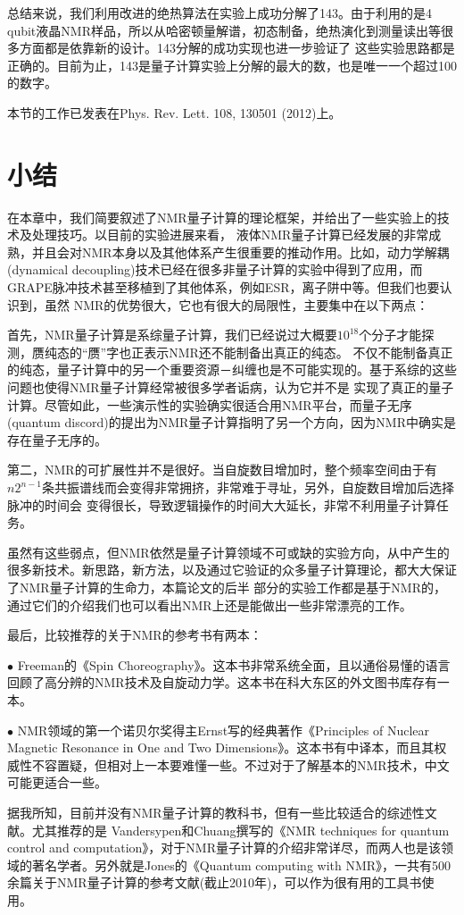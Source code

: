 总结来说，我们利用改进的绝热算法在实验上成功分解了143。由于利用的是4 qubit液晶NMR样品，所以从哈密顿量解谱，初态制备，绝热演化到测量读出等很多方面都是依靠新的设计。143分解的成功实现也进一步验证了
这些实验思路都是正确的。目前为止，143是量子计算实验上分解的最大的数，也是唯一一个超过100的数字。

本节的工作已发表在Phys. Rev. Lett. 108, 130501 (2012)\cite{shor143}上。



\section{小结}

在本章中，我们简要叙述了NMR量子计算的理论框架，并给出了一些实验上的技术及处理技巧。以目前的实验进展来看，
液体NMR量子计算已经发展的非常成熟，并且会对NMR本身以及其他体系产生很重要的推动作用。比如，动力学解耦(dynamical decoupling)技术已经在很多非量子计算的实验中得到了应用，而GRAPE脉冲技术甚至移植到了其他体系，例如ESR，离子阱中等。但我们也要认识到，虽然
NMR的优势很大，它也有很大的局限性，主要集中在以下两点：

首先，NMR量子计算是系综量子计算，我们已经说过大概要$10^{18}$个分子才能探测，赝纯态的“赝”字也正表示NMR还不能制备出真正的纯态。
不仅不能制备真正的纯态，量子计算中的另一个重要资源－纠缠也是不可能实现的。基于系综的这些问题也使得NMR量子计算经常被很多学者诟病，认为它并不是
实现了真正的量子计算。尽管如此，一些演示性的实验确实很适合用NMR平台，而量子无序(quantum discord)的提出为NMR量子计算指明了另一个方向，因为NMR中确实是存在量子无序的。

第二，NMR的可扩展性并不是很好。当自旋数目增加时，整个频率空间由于有$n2^{n-1}$条共振谱线而会变得非常拥挤，非常难于寻址，另外，自旋数目增加后选择脉冲的时间会
变得很长，导致逻辑操作的时间大大延长，非常不利用量子计算任务。

虽然有这些弱点，但NMR依然是量子计算领域不可或缺的实验方向，从中产生的很多新技术。新思路，新方法，以及通过它验证的众多量子计算理论，都大大保证了NMR量子计算的生命力，本篇论文的后半
部分的实验工作都是基于NMR的，通过它们的介绍我们也可以看出NMR上还是能做出一些非常漂亮的工作。

最后，比较推荐的关于NMR的参考书有两本：

$\bullet$ Freeman的《Spin Choreography》\cite{pps7}。这本书非常系统全面，且以通俗易懂的语言回顾了高分辨的NMR技术及自旋动力学。这本书在科大东区的外文图书库存有一本。

$\bullet$ NMR领域的第一个诺贝尔奖得主Ernst写的经典著作《Principles of Nuclear Magnetic Resonance
in One and Two Dimensions》\cite{ernst}。这本书有中译本，而且其权威性不容置疑，但相对上一本要难懂一些。不过对于了解基本的NMR技术，中文可能更适合一些。

据我所知，目前并没有NMR量子计算的教科书，但有一些比较适合的综述性文献\cite{nmrtext1,nmrtext2,nmrtext3,nmrtext4}。尤其推荐的是 Vandersypen和Chuang撰写的《NMR techniques for quantum control and computation》\cite{nmrtext3}，对于NMR量子计算的介绍非常详尽，而两人也是该领域的著名学者。另外就是Jones的《Quantum computing with NMR》\cite{nmrtext4}，一共有500余篇关于NMR量子计算的参考文献(截止2010年)，可以作为很有用的工具书使用。

